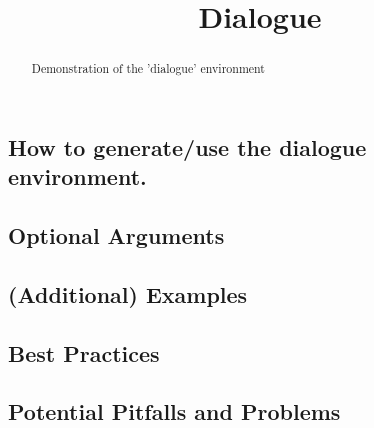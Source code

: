\documentclass{ximera}
\title{Dialogue}
\begin{document}
\begin{abstract}
    Demonstration of the 'dialogue' environment
\end{abstract}
\maketitle


    \subsection*{How to generate/use the dialogue environment.}
        
        
        
    \subsection*{Optional Arguments}
    
        
        
    \subsection*{(Additional) Examples}
        
        
        
    \subsection*{Best Practices}
    
        
        
    \subsection*{Potential Pitfalls and Problems}   
        
        
        
        
\end{document}
